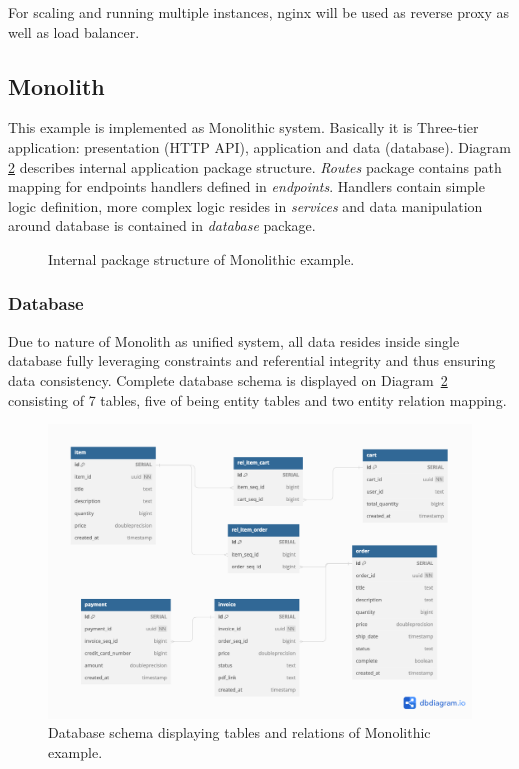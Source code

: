 For scaling and running multiple instances, nginx will be used as reverse proxy as well as load balancer.

\subsection{Monolith}
This example is implemented as Monolithic system. Basically it is Three-tier application: presentation (HTTP API), application and data (database). Diagram \ref{img:monolith_db_schema} describes internal application package structure. \textit{Routes} package contains path mapping for endpoints handlers defined in \textit{endpoints}. Handlers contain simple logic definition, more complex logic resides in \textit{services} and data manipulation around database is contained in \textit{database} package.

\begin{figure}
    \centering
    
    \caption{Internal package structure of Monolithic example. \label{img:monolith_package}}
\end{figure}


\subsubsection{Database}
Due to nature of Monolith as unified system, all data resides inside single database fully leveraging constraints and referential integrity and thus ensuring data consistency. Complete database schema is displayed on Diagram~\ref{img:monolith_db_schema} consisting of 7 tables, five of being entity tables and two entity relation mapping.

\begin{figure}
    \centering
    \includegraphics[width=\textwidth]{images/monolith_db_schema.png}
    \caption{Database schema displaying tables and relations of Monolithic example. \label{img:monolith_db_schema}}
\end{figure}



